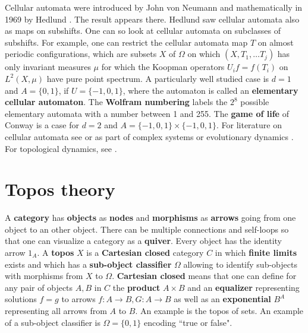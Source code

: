\documentclass[12pt]{amsart}
\newcounter{example}    \def\example#1{ \item \fontsize{12}{15} \selectfont #1 \fontsize{12}{15} \selectfont }
\begin{document}
Cellular automata were introduced by John von Neumann and mathematically
in 1969 by Hedlund \cite{Hed69}. The result appears there. Hedlund saw cellular automata also as
maps on subshifts. One can so look at cellular automata on subclasses of subshifts. For example,
one can restrict the cellular automata map $T$ on almost periodic configurations, which are subsets $X$ of $\Omega$
on which $(X,T_1,\dots T_j)$ has only invariant measures $\mu$ for which the Koopman operators 
$U_i f = f(T_i)$ on $L^2(X,\mu)$ have pure point spectrum. 
A particularly well studied case is $d=1$ and $A=\{0,1\}$, if $U=\{ -1,0,1\}$, where the automaton is called an 
{\bf elementary cellular automaton}. The {\bf Wolfram numbering} labels the $2^8$ possible 
elementary automata with a number between 1 and 255.
The {\bf game of life} of Conway is a case for $d=2$ and $A=\{ -1,0,1\} \times \{-1,0,1 \}$.
For literature on cellular automata see \cite{Wolfram86} or as part of complex systems \cite{Wolfram2002}
or evolutionary dynamics \cite{Nowak}. For topological dynamics, see \cite{DGS}.


\section{Topos theory}

A {\bf category} has {\bf objects} as {\bf nodes} and {\bf morphisms} as {\bf arrows}
going from one object to an other object. There can be multiple connections and self-loops so that one can
visualize a category as a {\bf quiver}. Every object has the identity arrow $1_A$. A {\bf topos} $X$ is a {\bf Cartesian closed}
category $C$ in which {\bf finite limits} exists and which has a {\bf sub-object classifier} $\Omega$ allowing
to identify sub-objects with morphisms from $X$ to $\Omega$.
{\bf Cartesian closed} means that one can define for any pair of objects $A,B$ in $C$ the {\bf product} $A \times B$
and an {\bf equalizer} representing solutions $f=g$ to arrows $f:A \to B, G:A \to B$ as well as an 
{\bf exponential} $B^A$ representing all arrows from $A$ to $B$. An example is the topos of sets.
An example of a sub-object classifier is $\Omega=\{0,1\}$ encoding ``true or false". 
\end{document}
